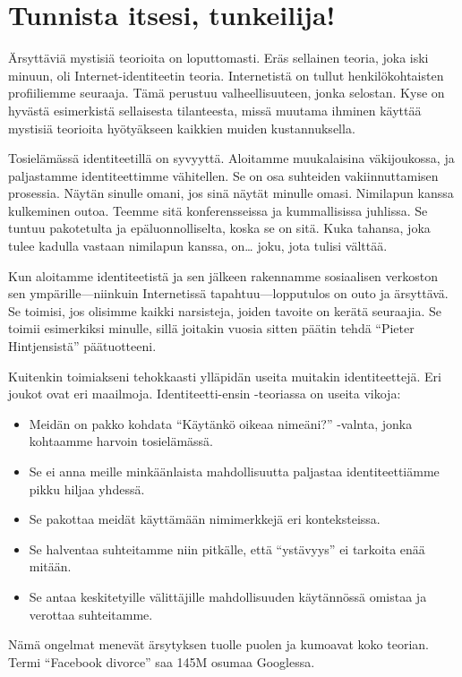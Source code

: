 \section{Tunnista itsesi, tunkeilija!}

Ärsyttäviä mystisiä teorioita on loputtomasti. Eräs sellainen teoria, joka iski minuun, oli Internet-identiteetin teoria. Internetistä on tullut henkilökohtaisten profiiliemme seuraaja. Tämä perustuu valheellisuuteen, jonka selostan. Kyse on hyvästä esimerkistä sellaisesta tilanteesta, missä muutama ihminen käyttää mystisiä teorioita hyötyäkseen kaikkien muiden kustannuksella.

Tosielämässä identiteetillä on syvyyttä. Aloitamme muukalaisina väkijoukossa, ja paljastamme identiteettimme vähitellen. Se on osa suhteiden vakiinnuttamisen prosessia. Näytän sinulle omani, jos sinä näytät minulle omasi. Nimilapun kanssa kulkeminen outoa. Teemme sitä konferensseissa ja kummallisissa juhlissa. Se tuntuu pakotetulta ja epäluonnolliselta, koska se on sitä. Kuka tahansa, joka tulee kadulla vastaan nimilapun kanssa, on{\ldots} joku, jota tulisi välttää.

Kun aloitamme identiteetistä ja sen jälkeen rakennamme sosiaalisen verkoston sen ympärille---niinkuin Internetissä tapahtuu---lopputulos on outo ja ärsyttävä. Se toimisi, jos olisimme kaikki narsisteja, joiden tavoite on kerätä seuraajia. Se toimii esimerkiksi minulle, sillä joitakin vuosia sitten päätin tehdä ``Pieter Hintjensistä'' päätuotteeni.

Kuitenkin toimiakseni tehokkaasti ylläpidän useita muitakin identiteettejä. Eri joukot ovat eri maailmoja. Identiteetti-ensin -teoriassa on useita vikoja:
\begin{itemize}
\item Meidän on pakko kohdata ``Käytänkö oikeaa nimeäni?'' -valnta, jonka kohtaamme harvoin tosielämässä.
\item Se ei anna meille minkäänlaista mahdollisuutta paljastaa identiteettiämme pikku hiljaa yhdessä.
\item Se pakottaa meidät käyttämään nimimerkkejä eri konteksteissa.
\item Se halventaa suhteitamme niin pitkälle, että ``ystävyys'' ei tarkoita enää mitään.
\item Se antaa keskitetyille välittäjille mahdollisuuden käytännössä omistaa ja verottaa suhteitamme.
\end{itemize}
Nämä ongelmat menevät ärsytyksen tuolle puolen ja kumoavat koko teorian. Termi ``Facebook divorce'' saa 145M osumaa Googlessa.

